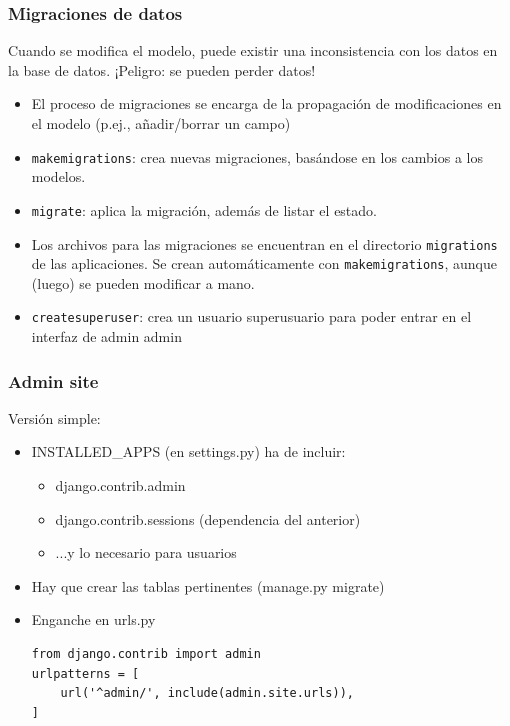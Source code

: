 \begin{frame}
\frametitle{Migraciones de datos}

Cuando se modifica el modelo, puede existir una inconsistencia con los datos en la base de datos. ¡Peligro: se pueden perder datos!

\begin{itemize}
  \item El proceso de migraciones se encarga de la propagación de modificaciones en el modelo (p.ej., añadir/borrar un campo)
  \item \texttt{makemigrations}: crea nuevas migraciones, basándose en los cambios a los modelos.
  \item \texttt{migrate}: aplica la migración, además de listar el estado.
  \item Los archivos para las migraciones se encuentran en el directorio \texttt{migrations} de las aplicaciones. Se crean automáticamente con \texttt{makemigrations}, aunque (luego) se pueden modificar a mano.
  \item \texttt{createsuperuser}: crea un usuario superusuario para poder entrar en el interfaz de admin admin
\end{itemize}

\end{frame}


\begin{frame}[fragile]
\frametitle{Admin site}

Versión simple:

\begin{itemize}
\item INSTALLED\_APPS (en settings.py) ha de incluir:
  \begin{itemize}
  \item django.contrib.admin
  \item django.contrib.sessions (dependencia del anterior)
  \item ...y lo necesario para usuarios
  \end{itemize}
\item Hay que crear las tablas pertinentes (manage.py migrate)
\item Enganche en urls.py
\begin{verbatim}
from django.contrib import admin
urlpatterns = [
    url('^admin/', include(admin.site.urls)),
]    
\end{verbatim}
\end{itemize}
\end{frame}

